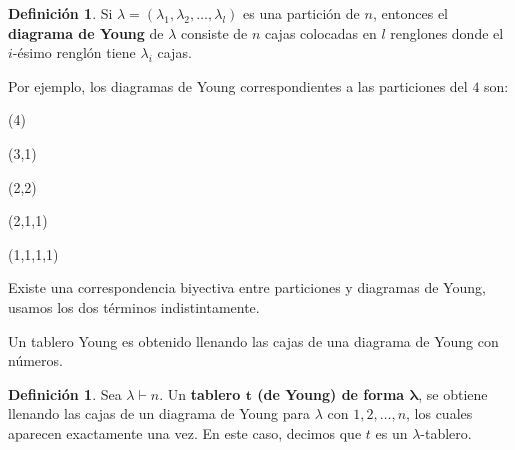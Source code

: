 \documentclass[12pt]{book}
\theoremstyle{definition}
\newtheorem{definition}[theorem]{Definición}
\newcounter{in}
\newcounter{ini}
\begin{document}
\begin{definition}
  Si $\lambda=(\lambda_{1},\lambda_{2},\ldots,\lambda_{l})$ es una
  partición de $n$, entonces el \textbf{diagrama de Young} de $\lambda$
  consiste de $n$ cajas colocadas en $l$ renglones donde el $i$-ésimo
  renglón tiene  $\lambda_{i}$ cajas.
\end{definition}

Por ejemplo, los diagramas de Young correspondientes a las particiones
del $4$ son: 

\begin{center}
  \begin{minipage}[h]{0.2\linewidth}
    \centering {}\bigskip

    (4)
  \end{minipage}
  \begin{minipage}[h]{0.15\linewidth}
    \centering {}\medskip

    (3,1)
  \end{minipage}
  \begin{minipage}[h]{0.15\linewidth}
    \centering {}\medskip

    (2,2)
  \end{minipage}
  \begin{minipage}[h]{0.15\linewidth}
    \centering {}\smallskip

    (2,1,1)
  \end{minipage}
  \begin{minipage}[h]{0.15\linewidth}
    \centering {}\smallskip

    (1,1,1,1)
  \end{minipage}
\end{center}

Existe una correspondencia biyectiva entre particiones y diagramas
de Young, usamos los dos términos indistintamente.

Un tablero Young es obtenido llenando las cajas de una diagrama de
Young con números.

\begin{definition}
  Sea $\lambda\vdash n$. Un \textbf{tablero $\boldsymbol{t}$ (de Young) de forma
    $\boldsymbol{\lambda}$}, se obtiene llenando las cajas de un
  diagrama de Young para $\lambda$ con $1,2,\ldots,n$, los cuales
  aparecen exactamente una vez. En este caso, decimos que $t$ es un
  $\lambda$-tablero.

\end{definition}
\end{document}
